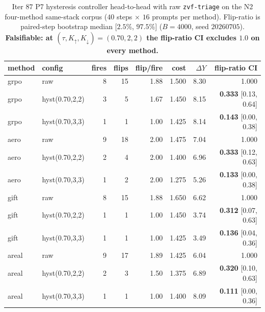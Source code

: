 \begin{table}[t]
\centering
\small
\caption{Iter $87$ P7 hysteresis controller head-to-head with raw
\texttt{zvf-triage} on the N2 four-method same-stack corpus
($40$ steps $\times$ $16$ prompts per method).
Flip-ratio is paired-step bootstrap median [$2.5$\%, $97.5$\%]
($B = 4000$, seed $20260705$).
\textbf{Falsifiable: at $(\tau, K_{\uparrow}, K_{\downarrow}) =
(0.70, 2, 2)$ the flip-ratio CI excludes $1.0$ on every method.}}
\label{tab:p7-iter87-hysteresis}
\begin{tabular}{llrrrrrr}
\hline
method & config & fires & flips & flip/fire
& cost & $\Delta Y$ & flip-ratio CI \\
\hline
grpo & raw             & 8 & 15 & 1.88 & 1.500 & 8.30 & 1.000 \\
grpo & hyst(0.70,2,2)  & 3 & 5  & 1.67 & 1.450 & 8.15 & \textbf{0.333} [0.13, 0.64] \\
grpo & hyst(0.70,3,3)  & 1 & 1  & 1.00 & 1.425 & 8.14 & \textbf{0.143} [0.00, 0.38] \\
aero & raw             & 9 & 18 & 2.00 & 1.475 & 7.04 & 1.000 \\
aero & hyst(0.70,2,2)  & 2 & 4  & 2.00 & 1.400 & 6.96 & \textbf{0.333} [0.12, 0.63] \\
aero & hyst(0.70,3,3)  & 1 & 2  & 2.00 & 1.275 & 5.26 & \textbf{0.133} [0.00, 0.38] \\
gift & raw             & 8 & 15 & 1.88 & 1.650 & 6.62 & 1.000 \\
gift & hyst(0.70,2,2)  & 1 & 1  & 1.00 & 1.450 & 3.74 & \textbf{0.312} [0.07, 0.63] \\
gift & hyst(0.70,3,3)  & 1 & 1  & 1.00 & 1.425 & 3.49 & \textbf{0.136} [0.04, 0.36] \\
areal& raw             & 9 & 17 & 1.89 & 1.425 & 6.04 & 1.000 \\
areal& hyst(0.70,2,2)  & 2 & 3  & 1.50 & 1.375 & 6.89 & \textbf{0.320} [0.10, 0.63] \\
areal& hyst(0.70,3,3)  & 1 & 1  & 1.00 & 1.400 & 8.09 & \textbf{0.111} [0.00, 0.36] \\
\hline
\end{tabular}
\end{table}